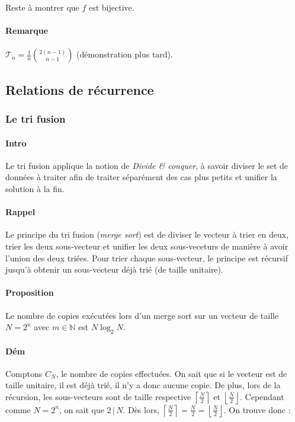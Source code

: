 \documentclass{article}
\begin{document}
			Reste à montrer que $f$ est bijective.  %

			\paragraph{Remarque} $\mathcal T_n = \frac 1n\binom {2(n-1)}{n-1}$ (démonstration plus tard).

		\subsection{Relations de récurrence}

			\subsubsection{Le tri fusion}

			\paragraph{Intro} Le tri fusion applique la notion de \textit{Divide \& conquer}, à savoir diviser le set de données à traiter afin de traiter
			séparément des cas plus petits et unifier la solution à la fin.

			\paragraph{Rappel} Le principe du tri fusion (\textit{merge sort}) est de diviser le vecteur à trier en deux, trier les deux sous-vecteur et
			unifier les deux sous-veceturs de manière à avoir l'union des deux triées. Pour trier chaque sous-vecteur, le principe est récursif jusqu'à obtenir
			un sous-vecteur déjà trié (de taille unitaire).

			\paragraph{Proposition} Le nombre de copies exécutées lors d'un merge sort sur un vecteur de taille $N = 2^n$ avec $m \in \mathbb N$ est $N\log_2N$.

			\paragraph{Dém} Comptons $C_N$, le nombre de copies effectuées. On sait que si le vecteur est de taille unitaire, il est déjà trié, il n'y a donc aucune copie.
			De plus, lors de la récursion, les sous-vecteurs sont de taille respective $\left \lceil \frac N2 \right \rceil$ et $\left \lfloor \frac N2 \right \rfloor$.
			Cependant comme $N = 2^n$, on sait que $2 \, | \, N$. Dès lors, $\left \lceil \frac N2 \right \rceil = \frac N2 = \left \lfloor \frac N2 \right \rfloor$.
			On trouve donc :
\end{document}
